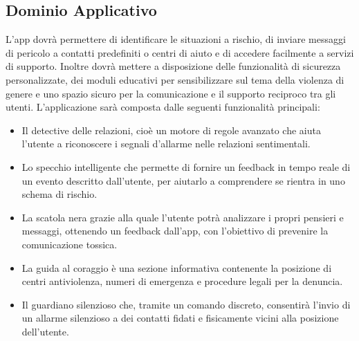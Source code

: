 \documentclass[a4paper,12pt]{article}
\begin{document}
    \subsection{Dominio Applicativo}
    L’app dovrà permettere di identificare le situazioni a rischio, di inviare messaggi di pericolo a contatti predefiniti o centri di aiuto e di accedere facilmente a servizi di supporto. Inoltre dovrà mettere a disposizione delle funzionalità di sicurezza personalizzate, dei moduli educativi per sensibilizzare sul tema della violenza di genere e uno spazio sicuro per la comunicazione e il supporto reciproco tra gli utenti.
    L’applicazione sarà composta dalle seguenti funzionalità principali:
    \begin{itemize}
        \item Il detective delle relazioni, cioè un motore di regole avanzato che aiuta l’utente a riconoscere i segnali d’allarme nelle relazioni sentimentali.
        \item Lo specchio intelligente che permette di fornire un feedback in tempo reale di un evento descritto dall’utente, per aiutarlo a comprendere se rientra in uno schema di rischio.
        \item La scatola nera grazie alla quale l’utente potrà analizzare i propri pensieri e messaggi, ottenendo un feedback dall’app, con l’obiettivo di prevenire la comunicazione tossica.
        \item La guida al coraggio è una sezione informativa contenente la posizione di centri antiviolenza, numeri di emergenza e procedure legali per la denuncia.
        \item Il guardiano silenzioso che, tramite un comando discreto, consentirà l’invio di un allarme silenzioso a dei contatti fidati e fisicamente vicini alla posizione dell’utente.
    \end{itemize}
\end{document}
